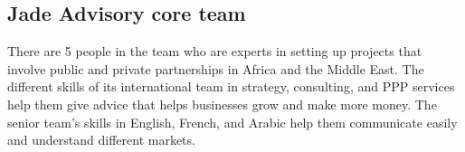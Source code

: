 \subsection{Jade Advisory core team}
There are 5 people in the team who are experts in setting up projects that involve public and private partnerships in Africa and the Middle East. The different skills of its international team in strategy, consulting, and PPP services help them give advice that helps businesses grow and make more money. The senior team's skills in English, French, and Arabic help them communicate easily and understand different markets.
